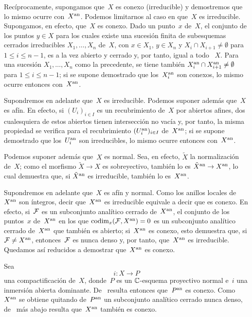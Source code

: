 Recíprocamente, supongamos que~$X$ es conexo (\resp irreducible) y demostremos
que lo mismo ocurre con~$X^\an$. Podemos limitarnos al caso en que~$X$ es
irreducible. Supongamos, en efecto, que~$X$ es conexo. Dado un punto~$x$
de~$X$, el conjunto de los puntos $y\in X$ para los cuales existe una
sucesión finita de subesquemas cerrados irreducibles $X_1,\dots,X_n$ de~$X$,
con $x\in X_1$, $y\in X_n$ y $X_i\cap X_{i+1}\neq\emptyset$ para
$1\leq i\leq n-1$, es a la vez abierto y cerrado y, por tanto, igual a todo
~$X$. Para una sucesión $X_1,\dots,X_n$ como la precedente, se tiene también
$X_{i}^\an\cap X_{i+1}^\an\neq\emptyset$ para $1\leq i\leq n-1$; si se supone
demostrado que los~$X_{i}^\an$ son conexos, lo mismo ocurre entonces
con~$X^\an$.

Supondremos
en adelante que~$X$ es irreducible. Podemos suponer además que~$X$ es afín.
En efecto, si $(U_i)_{i\in I}$ es un recubrimiento de~$X$ por abiertos
afines, dos cualesquiera de estos abiertos tienen intersección no vacía y,
por tanto, la misma propiedad se verifica para el recubrimiento
$(U_{i}^\an)_{i\in I}$ de~$X^\an$; si se supone demostrado que los~$U_{i}^\an$
son irreducibles, lo mismo ocurre entonces con~$X^\an$.

Podemos suponer además que~$X$ es normal. Sea, en efecto, $\tilde X$ la
normalización de~$X$; como el morfismo $\tilde X\to X$ es sobreyectivo,
también lo es $\tilde X^\an\to X^\an$, lo cual demuestra que, si
$\tilde X^\an$ es irreducible, también lo es~$X^\an$.

Supondremos en adelante que~$X$ es afín y normal. Como los anillos locales
de~$X^\an$ son íntegros, decir que~$X^\an$ es irreducible equivale a decir
que es conexo. En efecto, si~$\cal{F}$ es un subconjunto analítico cerrado
de~$X^\an$, el conjunto de los puntos~$x$ de~$X^\an$ en los que
$\codim_x(\cal{F},X^\an)=0$ es un subconjunto analítico cerrado de~$X^\an$
\cite[ A cor]{XII.4} que también es abierto; si~$X^\an$ es
conexo, esto demuestra que, si $\cal{F}\neq X^\an$, entonces~$\cal{F}$ es
nunca denso y, por tanto, que~$X^\an$ es irreducible. Quedamos así reducidos
a demostrar que~$X^\an$ es conexo.

Sea
$$
i\colon X\to P
$$
una compactificación de~$X$, donde~$P$ es un $\CC$-esquema proyectivo normal
e~$i$ una inmersión abierta dominante. De~\cite[~th]{XII.10}
resulta entonces que~$P^\an$ es conexo. Como~$X^\an$ se obtiene quitando
de~$P^\an$ un subconjunto analítico cerrado nunca denso, de~
más abajo resulta que~$X^\an$ también es conexo.

